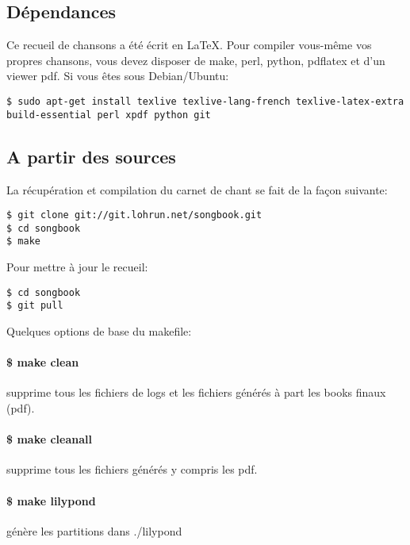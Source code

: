 \documentclass[a4paper,twoside]{article}
\begin{document}
\subsection{Dépendances}

Ce recueil de chansons a été écrit en LaTeX. Pour compiler vous-même
vos propres chansons, vous devez disposer de make, perl, python,
pdflatex et d'un viewer pdf. Si vous êtes sous Debian/Ubuntu:

\begin{verbatim}
$ sudo apt-get install texlive texlive-lang-french texlive-latex-extra
build-essential perl xpdf python git
\end{verbatim}

\subsection{A partir des sources}

La récupération et compilation du carnet de chant se fait de la façon suivante:

\begin{verbatim}
$ git clone git://git.lohrun.net/songbook.git
$ cd songbook
$ make
\end{verbatim}

Pour mettre à jour le recueil:

\begin{verbatim}
$ cd songbook
$ git pull
\end{verbatim}

Quelques options de base du makefile:

\paragraph{\$ make clean} 
supprime tous les fichiers de logs et les fichiers générés à part les
books finaux (pdf).

\paragraph{\$ make cleanall}
supprime tous les fichiers générés y compris les pdf.

\paragraph{\$ make lilypond}
génère les partitions dans ./lilypond
\end{document}
